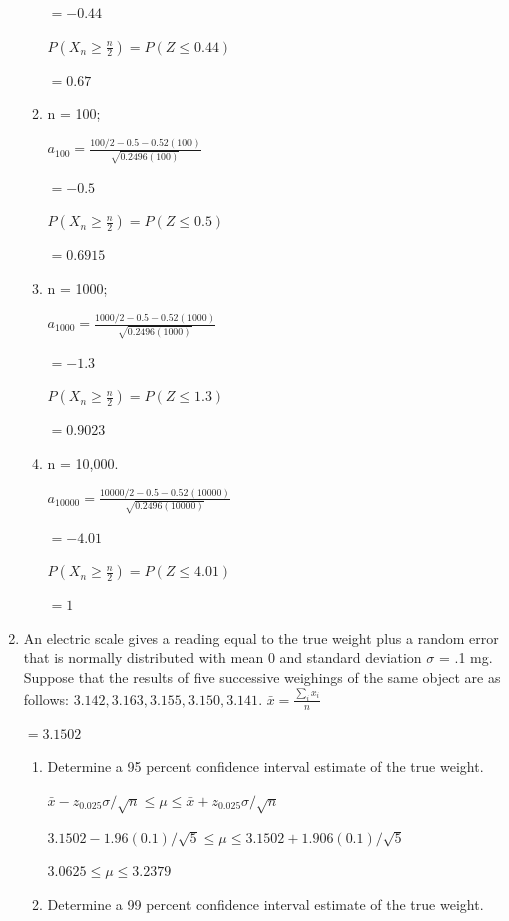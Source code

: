 \documentclass{article}
\begin{document}
\begin{enumerate}
\begin{enumerate}
        $= -0.44$

        $P\left(X_n \geq \frac{n}{2}\right) = P\left(Z \leq 0.44\right)$

        $= 0.67$
        \item n = 100;
        
        $a_{100} = \frac{100/2 - 0.5 -0.52(100)}{\sqrt{0.2496(100)}}$

        $= -0.5$

        $P\left(X_n \geq \frac{n}{2}\right) = P\left(Z \leq 0.5\right)$

        $= 0.6915$

        \item n = 1000;
        
        $a_{1000} = \frac{1000/2 - 0.5 -0.52(1000)}{\sqrt{0.2496(1000)}}$

        $= -1.3$

        $P\left(X_n \geq \frac{n}{2}\right) = P\left(Z \leq 1.3\right)$

        $= 0.9023$
        \item n = 10,000.
        
        $a_{10000} = \frac{10000/2 - 0.5 -0.52(10000)}{\sqrt{0.2496(10000)}}$

        $= -4.01$

        $P\left(X_n \geq \frac{n}{2}\right) = P\left(Z \leq 4.01\right)$

        $= 1$
    \end{enumerate}

    \item An electric scale gives a reading equal to the true weight plus a random error that is normally distributed with mean 0 and standard deviation $\sigma$ = .1 mg. Suppose that the results of five successive weighings of the same object are as follows: $3.142, 3.163, 3.155, 3.150, 3.141$.
    $\displaystyle \bar{x} = \frac{\sum_{i}{x_i}}{n}$

    $= 3.1502$
    \begin{enumerate}
        \item Determine a 95 percent confidence interval estimate of the true weight.
        
        $\bar{x} - z_{0.025}\sigma/\sqrt{n} \leq \mu \leq \bar{x} + z_{0.025}\sigma/\sqrt{n}$

        $3.1502 - 1.96(0.1)/\sqrt{5} \leq \mu \leq 3.1502 + 1.906(0.1)/\sqrt{5}$

        $3.0625 \leq \mu \leq 3.2379$
        \item Determine a 99 percent confidence interval estimate of the true weight.
        

\end{enumerate}
\end{enumerate}
\end{document}
